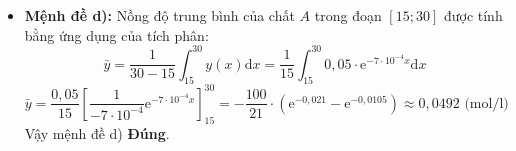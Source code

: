 \begin{ex}
{\begin{itemize}
 \[ v_{\text{tb}} = \dfrac{y(30) - y(15)}{30 - 15} \]
 Vì hàm số $y(x) = 0{,}05 \cdot \mathrm{e}^{-7 \cdot 10^{-4} x}$ có đạo hàm $y'(x) = -7 \cdot 10^{-4} \cdot y(x) < 0, \forall x \ge 0$ nên $y(x)$ là hàm nghịch biến. Do đó $y(30) < y(15) \Rightarrow y(30) - y(15) < 0 \Rightarrow v_{\text{tb}} < 0$.\\
 Vậy tốc độ biến thiên trung bình phải mang giá trị âm. Mệnh đề c) \textbf{Sai}.
 \item \textbf{Mệnh đề d):} Nồng độ trung bình của chất $A$ trong đoạn $[15; 30]$ được tính bằng ứng dụng của tích phân:
 \[ \bar{y} = \dfrac{1}{30 - 15} \int_{15}^{30} y(x) \mathrm{d}x = \dfrac{1}{15} \int_{15}^{30} 0{,}05 \cdot \mathrm{e}^{-7 \cdot 10^{-4} x} \mathrm{d}x \]
 \[ \bar{y} = \dfrac{0{,}05}{15} \left[ \dfrac{1}{-7 \cdot 10^{-4}} \mathrm{e}^{-7 \cdot 10^{-4} x} \right]_{15}^{30} = -\dfrac{100}{21} \cdot \left( \mathrm{e}^{-0{,}021} - \mathrm{e}^{-0{,}0105} \right) \approx 0{,}0492\text{ (mol/l)} \]
 Vậy mệnh đề d) \textbf{Đúng}.
 \end{itemize}
 }
\end{ex}
